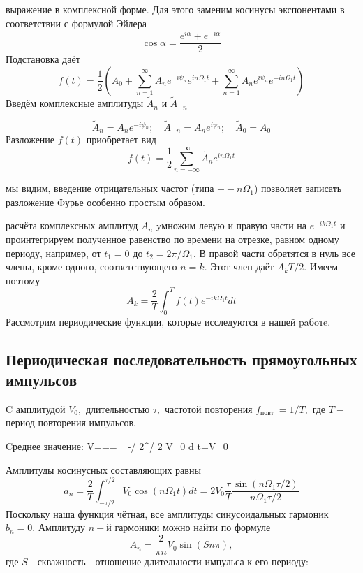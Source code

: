 \documentclass[a4paper,12pt]{article} %
\begin{document}
\hfill {} выражение в комплексной форме. Для этого заменим косинусы экспонентами в соответствии с формулой Эйлера
$$
\cos \alpha=\frac{e^{i \alpha}+e^{-i \alpha}}{2}
$$
Подстановка даёт
$$
f(t)=\frac{1}{2}\left(A_{0}+\sum_{n=1}^{\infty} A_{n} e^{-i \psi_{n}} e^{i n \Omega_{1} t}+\sum_{n=1}^{\infty} A_{n} e^{i \psi_{n}} e^{-i n \Omega_{1} t}\right)
$$
Введём комплексные амплитуды $\tilde{A}_{n}$ и $\tilde{A}_{-n}$

$$
\tilde{A}_{n}=A_{n} e^{-i \psi_{n}} ; \quad \tilde{A}_{-n}=A_{n} e^{i \psi_{n}} ; \quad \tilde{A}_{0}=A_{0}
$$
Разложение $f(t)$ приобретает вид
$$
f(t)=\frac{1}{2} \sum_{n=-\infty}^{\infty} \tilde{A}_{n} e^{i n \Omega_{1} t}
$$

\hfill {} мы видим, введение отрицательных частот (типа $−-n\Omega_1$) позволяет записать разложение Фурье особенно простым образом. 

\hfill {} расчёта комплексных амплитуд $A_{n}$ yмножим левую и правую части на $e^{-i k \Omega_{1} t}$ и проинтегрируем полученное равенство по времени на отрезке, равном одному периоду, например, от $t_{1}=0$ до $t_{2}=2 \pi / \Omega_{1} .$ В правой части обратятся в нуль все члены, кроме одного, соответствующего $n=k .$ Этот член даёт $A_{k} T / 2 .$ Имеем поэтому
$$
A_{k}=\frac{2}{T} \int_{0}^{T} f(t) e^{-i k \Omega_{1} t} d t
$$
Рассмотрим периодические функции, которые исследуются в нашей paбoтe.


\subsection{Периодическая последовательность прямоугольных импульсов}
\hfill \break C амплитудой $V_{0},$ длительностью $\tau,$ частотой повторения $f_{\text {повт }}=1 / T,$ где $T-$ период повторения импульсов.


\hfill \break Cреднее значение: \langle V\rangle=== \int_{-\tau / 2}^{\tau / 2} V_{0} d t=V_{0} 

\hfill \break Амплитуды косинусных составляющих равны
$$
a_{n}=\frac{2}{T} \int_{-\tau / 2}^{\tau / 2} V_{0} \cos \left(n \Omega_{1} t\right) d t=2 V_{0} \frac{\tau}{T} \frac{\sin \left(n \Omega_{1} \tau / 2\right)}{n \Omega_{1} \tau / 2} 
$$
Поскольку наша функция чётная, все амплитуды синусоидальных гармоник $b_{n}=0 .$ Амплитуду $n-$й гармоники можно найти по формуле
$$
A_{n}=\frac{2}{\pi n}V_{0}\sin(Sn\pi),
$$ где $S$ - скважность - отношение длительности импульса к его периоду:
\end{document}
